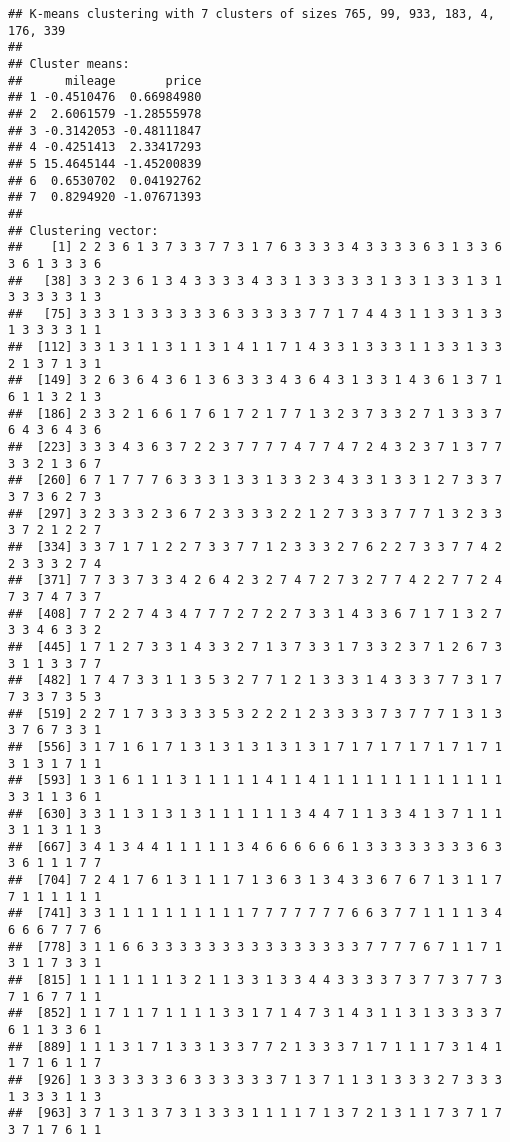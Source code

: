 \documentclass[
]{article}
\begin{document}
\begin{verbatim}
## K-means clustering with 7 clusters of sizes 765, 99, 933, 183, 4, 176, 339
## 
## Cluster means:
##      mileage       price
## 1 -0.4510476  0.66984980
## 2  2.6061579 -1.28555978
## 3 -0.3142053 -0.48111847
## 4 -0.4251413  2.33417293
## 5 15.4645144 -1.45200839
## 6  0.6530702  0.04192762
## 7  0.8294920 -1.07671393
## 
## Clustering vector:
##    [1] 2 2 3 6 1 3 7 3 3 7 7 3 1 7 6 3 3 3 3 4 3 3 3 3 6 3 1 3 3 6 3 6 1 3 3 3 6
##   [38] 3 3 2 3 6 1 3 4 3 3 3 3 4 3 3 1 3 3 3 3 3 1 3 3 1 3 3 1 3 1 3 3 3 3 3 1 3
##   [75] 3 3 3 1 3 3 3 3 3 3 6 3 3 3 3 3 7 7 1 7 4 4 3 1 1 3 3 1 3 3 1 3 3 3 3 1 1
##  [112] 3 3 1 3 1 1 3 1 1 3 1 4 1 1 7 1 4 3 3 1 3 3 3 1 1 3 3 1 3 3 2 1 3 7 1 3 1
##  [149] 3 2 6 3 6 4 3 6 1 3 6 3 3 3 4 3 6 4 3 1 3 3 1 4 3 6 1 3 7 1 6 1 1 3 2 1 3
##  [186] 2 3 3 2 1 6 6 1 7 6 1 7 2 1 7 7 1 3 2 3 7 3 3 2 7 1 3 3 3 7 6 4 3 6 4 3 6
##  [223] 3 3 3 4 3 6 3 7 2 2 3 7 7 7 7 4 7 7 4 7 2 4 3 2 3 7 1 3 7 7 3 3 2 1 3 6 7
##  [260] 6 7 1 7 7 7 6 3 3 3 1 3 3 1 3 3 2 3 4 3 3 1 3 3 1 2 7 3 3 7 3 7 3 6 2 7 3
##  [297] 3 2 3 3 3 2 3 6 7 2 3 3 3 3 2 2 1 2 7 3 3 3 7 7 7 1 3 2 3 3 3 7 2 1 2 2 7
##  [334] 3 3 7 1 7 1 2 2 7 3 3 7 7 1 2 3 3 3 2 7 6 2 2 7 3 3 7 7 4 2 2 3 3 3 2 7 4
##  [371] 7 7 3 3 7 3 3 4 2 6 4 2 3 2 7 4 7 2 7 3 2 7 7 4 2 2 7 7 2 4 7 3 7 4 7 3 7
##  [408] 7 7 2 2 7 4 3 4 7 7 7 2 7 2 2 7 3 3 1 4 3 3 6 7 1 7 1 3 2 7 3 3 4 6 3 3 2
##  [445] 1 7 1 2 7 3 3 1 4 3 3 2 7 1 3 7 3 3 1 7 3 3 2 3 7 1 2 6 7 3 3 1 1 3 3 7 7
##  [482] 1 7 4 7 3 3 1 1 3 5 3 2 7 7 1 2 1 3 3 3 1 4 3 3 3 7 7 3 1 7 7 3 3 7 3 5 3
##  [519] 2 2 7 1 7 3 3 3 3 3 5 3 2 2 2 1 2 3 3 3 3 7 3 7 7 7 1 3 1 3 3 7 6 7 3 3 1
##  [556] 3 1 7 1 6 1 7 1 3 1 3 1 3 1 3 1 3 1 7 1 7 1 7 1 7 1 7 1 7 1 3 1 3 1 7 1 1
##  [593] 1 3 1 6 1 1 1 3 1 1 1 1 1 4 1 1 4 1 1 1 1 1 1 1 1 1 1 1 1 1 3 3 1 1 3 6 1
##  [630] 3 3 1 1 3 1 3 1 3 1 1 1 1 1 1 3 4 4 7 1 1 3 3 4 1 3 7 1 1 1 3 1 1 3 1 1 3
##  [667] 3 4 1 3 4 4 1 1 1 1 1 3 4 6 6 6 6 6 6 1 3 3 3 3 3 3 3 3 6 3 3 6 1 1 1 7 7
##  [704] 7 2 4 1 7 6 1 3 1 1 1 7 1 3 6 3 1 3 4 3 3 6 7 6 7 1 3 1 1 7 7 1 1 1 1 1 1
##  [741] 3 3 1 1 1 1 1 1 1 1 1 1 7 7 7 7 7 7 7 6 6 3 7 7 1 1 1 1 3 4 6 6 6 7 7 7 6
##  [778] 3 1 1 6 6 3 3 3 3 3 3 3 3 3 3 3 3 3 3 3 7 7 7 7 6 7 1 1 7 1 3 1 1 7 3 3 1
##  [815] 1 1 1 1 1 1 1 3 2 1 1 3 3 1 3 3 4 4 3 3 3 3 7 3 7 7 3 7 7 3 7 1 6 7 7 1 1
##  [852] 1 1 7 1 1 7 1 1 1 1 3 3 1 7 1 4 7 3 1 4 3 1 1 3 1 3 3 3 3 7 6 1 1 3 3 6 1
##  [889] 1 1 1 3 1 7 1 3 3 1 3 3 7 7 2 1 3 3 3 7 1 7 1 1 1 7 3 1 4 1 1 7 1 6 1 1 7
##  [926] 1 3 3 3 3 3 3 6 3 3 3 3 3 3 7 1 3 7 1 1 3 1 3 3 3 2 7 3 3 3 1 3 3 3 1 1 3
##  [963] 3 7 1 3 1 3 7 3 1 3 3 3 1 1 1 1 7 1 3 7 2 1 3 1 1 7 3 7 1 7 3 7 1 7 6 1 1

\end{verbatim}
\end{document}
